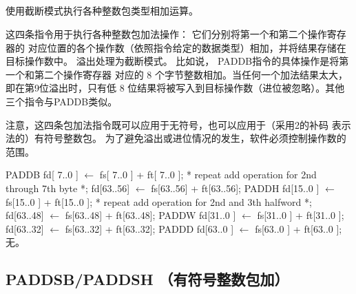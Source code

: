 \begin{instructionblk}
   \\
   \\
   \\
   \\
  {使用截断模式执行各种整数包类型相加运算。}
  {这四条指令用于执行各种整数包加法操作： 它们分别将第一个和第二个操作寄存器的
  对应位置的各个操作数（依照指令给定的数据类型）相加，并将结果存储在目标操作数中。
  溢出处理为截断模式。 比如说， PADDB指令的具体操作是将第一个和第二个操作寄存器
  对应的 8 个字节整数相加。当任何一个加法结果太大，即在第9位溢出时，只有低 8
  位结果将被写入到目标操作数（进位被忽略）。其他三个指令与PADDB类似。
  
  注意，这四条包加法指令既可以应用于无符号，也可以应用于（采用2的补码
  表示法的）有符号整数包。 为了避免溢出或进位情况的发生，软件必须控制操作数的范围。}
  {PADDB \narrownewline
  fd[ 7..0 ] $\leftarrow$ fs[ 7..0 ] + ft[ 7..0 ]; \narrownewline
  * repeat add operation for 2nd through 7th byte *; \narrownewline
  fd[63..56] $\leftarrow$ fs[63..56] + ft[63..56]; \narrownewline \narrownewline
  PADDH \narrownewline
  fd[15..0 ] $\leftarrow$ fs[15..0 ] + ft[15..0 ]; \narrownewline
  * repeat add operation for 2nd and 3th halfword *; \narrownewline
  fd[63..48] $\leftarrow$ fs[63..48] + ft[63..48]; \narrownewline \narrownewline
  PADDW \narrownewline
  fd[31..0 ] $\leftarrow$ fs[31..0 ] + ft[31..0 ]; \narrownewline
  fd[63..32] $\leftarrow$ fs[63..32] + ft[63..32]; \narrownewline \narrownewline
  PADDD \narrownewline
  fd[63..0 ] $\leftarrow$ fs[63..0 ] + ft[63..0 ];}
  {无。}
\end{instructionblk}

\subsection{PADDSB/PADDSH （有符号整数包加）}


